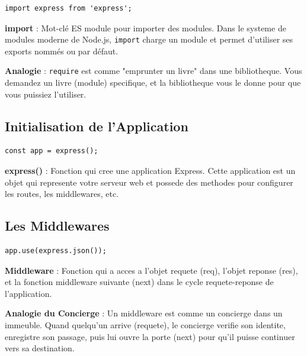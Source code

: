 \documentclass[a4paper,12pt]{book}
\begin{document}
\begin{lstlisting}[style=javascript]
import express from 'express';
\end{lstlisting}

\begin{definitionbox}
    \textbf{import} : Mot-clé ES module pour importer des modules. Dans le systeme de modules moderne de Node.js, \texttt{import} charge un module et permet d'utiliser ses exports nommés ou par défaut.
\end{definitionbox}

\begin{analogybox}
    \textbf{Analogie} : \texttt{require} est comme "emprunter un livre" dans une bibliotheque. Vous demandez un livre (module) specifique, et la bibliotheque vous le donne pour que vous puissiez l'utiliser.
\end{analogybox}

\subsection{Initialisation de l'Application}

\begin{lstlisting}[style=javascript]
const app = express();
\end{lstlisting}

\begin{definitionbox}
    \textbf{express()} : Fonction qui cree une application Express. Cette application est un objet qui represente votre serveur web et possede des methodes pour configurer les routes, les middlewares, etc.
\end{definitionbox}

\subsection{Les Middlewares}

\begin{lstlisting}[style=javascript]
app.use(express.json());
\end{lstlisting}

\begin{definitionbox}
    \textbf{Middleware} : Fonction qui a acces a l'objet requete (req), l'objet reponse (res), et la fonction middleware suivante (next) dans le cycle requete-reponse de l'application.
\end{definitionbox}

\begin{analogybox}
    \textbf{Analogie du Concierge} : Un middleware est comme un concierge dans un immeuble. Quand quelqu'un arrive (requete), le concierge verifie son identite, enregistre son passage, puis lui ouvre la porte (next) pour qu'il puisse continuer vers sa destination.
\end{analogybox}
\end{document}
